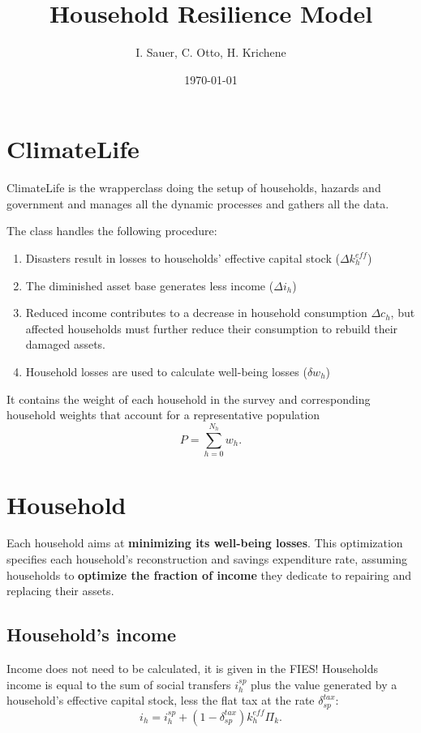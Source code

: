 \documentclass{article}
\author{I. Sauer, C. Otto, H. Krichene}
\title{Household Resilience Model }
\date{\today}
\begin{document}
\maketitle
\section{ClimateLife}
ClimateLife is the wrapperclass doing the setup of households, hazards and government and manages all the dynamic processes and gathers all the data.

The class handles the following procedure:
\begin{enumerate}
\item Disasters result in losses to households' effective capital stock ($\Delta k_{h}^{eff}$)
\item The diminished asset base generates less income ($\Delta i_{h}$)
\item Reduced income contributes to a decrease in household consumption $\Delta c_{h}$, but affected households must further reduce their consumption to rebuild their damaged assets.
\item Household losses are used to calculate well-being losses ($\delta w_{h}$)
\end{enumerate}

It contains  the weight of each household in the survey and corresponding household weights that account for a representative population
\begin{equation}
  \label{eq:P}
P = \sum_{h=0}^{N_h} w_h.
\end{equation}

\section{Household}
Each household aims at \textbf{minimizing its well-being losses}. This optimization specifies each household's reconstruction and savings expenditure rate, assuming households to \textbf{optimize the fraction of income} they dedicate to repairing and replacing their assets.

\subsection{Household's income}
Income does not need to be calculated, it is given in the FIES!
Households income is equal to the sum of social transfers $i_h^{sp}$ plus the value generated by a household's effective capital stock, less the flat tax at the rate $\delta_{sp}^{tax}$:
\begin{equation}
  \label{eq:ih}
  i_h = i_h^{sp}+(1-\delta_{sp}^{tax}) k_h^{eff} \Pi_k.
\end{equation}
\end{document}
